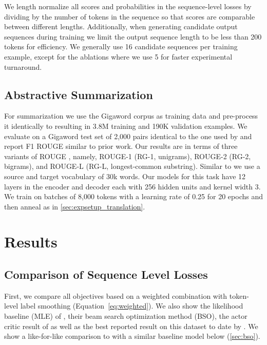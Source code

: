 \documentclass[11pt,a4paper]{article}
\begin{document}
We length normalize all scores and probabilities in the sequence-level losses by dividing by the number of tokens in the sequence so that scores are comparable between different lengths.
Additionally, when generating candidate output sequences during training we limit the output sequence length to be less than 200 tokens for efficiency.
We generally use 16 candidate sequences per training example, except for the ablations where we use 5 for faster experimental turnaround.


\subsection{Abstractive Summarization}
\label{sec:expsetup_summary}

For summarization we use the Gigaword corpus as training data \cite{graff2003english} and pre-process it identically to \citet{rush2015abs} resulting in 3.8M training and 190K validation examples.
We evaluate on a Gigaword test set of 2,000 pairs identical to the one used by \citet{rush2015abs} and report F1 ROUGE similar to prior work.
Our results are in terms of three variants of ROUGE \cite{lin2004rouge}, namely, ROUGE-1 (RG-1, unigrams), ROUGE-2 (RG-2, bigrams), and ROUGE-L (RG-L, longest-common substring).
Similar to \citet{ayana2016neural} we use a source and target vocabulary of 30k words.
Our models for this task have 12 layers in the encoder and decoder each with 256 hidden units and kernel width 3.
We train on batches of 8,000 tokens with a learning rate of 0.25 for 20 epochs and then anneal as in \textsection\ref{sec:expsetup_translation}.


\section{Results}
\label{sec:results}


\subsection{Comparison of Sequence Level Losses}
\label{sec:seqlosscmp}

First, we compare all objectives based on a weighted combination with token-level label smoothing (Equation~\ref{eq:weighted}).
We also show the likelihood baseline (MLE) of \citet{wiseman2016acl}, their beam search optimization method (BSO), the actor critic result of \citet{bahdanau2016ac} as well as the best reported result on this dataset to date by \citet{huang2017npbmt}.
We show a like-for-like comparison to \citet{wiseman2016acl} with a similar baseline model below (\textsection\ref{sec:bso}).
\end{document}
